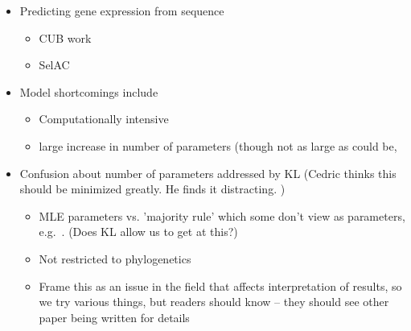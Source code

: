 \documentclass[12pt,letterpaper]{article}
\newcommand{\PC}{physico-chemical\xspace}
\newcommand{\selac}{SelAC\xspace}
\begin{document}
\begin{itemize}
\begin{itemize}
\begin{itemize}
  \item Model assumptions about gene regulation.
    More generic interpretation is that sensitivity of fitness from deviation from optimal sequence is proportional to gene expression.
    Our interpretation suggests we should be able to explain interlinage variation in a gene's expression using our cost-benefit function $\eta$. 
  \item Assume same \PC weighting for all parts of protein.
  \item Only works with proteins
  \end{itemize}
\item many of  these shortcomings can be addressed in future work.
 (e.g. extend approach to work with non-coding sequences such as 18s or UCEs.)
\end{itemize}
\item Predicting gene expression from sequence
  \begin{itemize}
  \item CUB work
  \item \selac
  \end{itemize}
\item Model shortcomings include 
  \begin{itemize}
  \item Computationally intensive
  \item large increase in number of parameters (though not as large as could be, \citep[c.f.][HIV entropy models]{RodrigueAndLartillot2014}
  \end{itemize}
\item Confusion about number of parameters addressed by KL (Cedric thinks this should be minimized greatly.  
  He finds it distracting.
)

  \begin{itemize}
  \item MLE parameters vs. 'majority rule' which some don't view as parameters, e.g.~\citet{YangAndNielsen2008}. (Does KL allow us to get at this?)
  \item Not restricted to phylogenetics
  \item Frame this as an issue in the field that affects interpretation of results, so we try various things, but readers should know -- they should see other paper being written for details
  \end{itemize}
\end{itemize}
\end{document}
